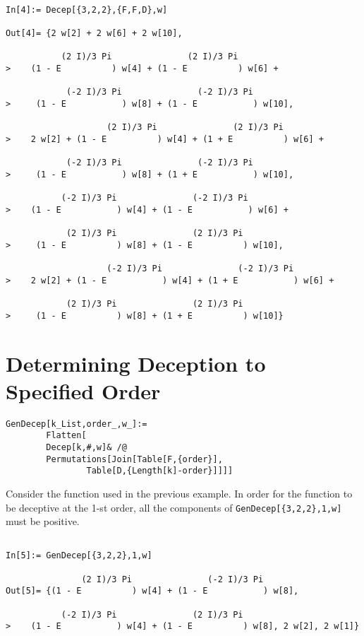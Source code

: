 \begin{verbatim}

In[4]:= Decep[{3,2,2},{F,F,D},w]

Out[4]= {2 w[2] + 2 w[6] + 2 w[10], 
 
           (2 I)/3 Pi               (2 I)/3 Pi
>    (1 - E          ) w[4] + (1 - E          ) w[6] + 
 
            (-2 I)/3 Pi               (-2 I)/3 Pi
>     (1 - E           ) w[8] + (1 - E           ) w[10], 
 
                    (2 I)/3 Pi               (2 I)/3 Pi
>    2 w[2] + (1 - E          ) w[4] + (1 + E          ) w[6] + 
 
            (-2 I)/3 Pi               (-2 I)/3 Pi
>     (1 - E           ) w[8] + (1 + E           ) w[10], 
 
           (-2 I)/3 Pi               (-2 I)/3 Pi
>    (1 - E           ) w[4] + (1 - E           ) w[6] + 
 
            (2 I)/3 Pi               (2 I)/3 Pi
>     (1 - E          ) w[8] + (1 - E          ) w[10], 
 
                    (-2 I)/3 Pi               (-2 I)/3 Pi
>    2 w[2] + (1 - E           ) w[4] + (1 + E           ) w[6] + 
 
            (2 I)/3 Pi               (2 I)/3 Pi
>     (1 - E          ) w[8] + (1 + E          ) w[10]}

\end{verbatim}
\section{Determining Deception to Specified Order}
\begin{verbatim}
GenDecep[k_List,order_,w_]:=
        Flatten[
        Decep[k,#,w]& /@
        Permutations[Join[Table[F,{order}],
                Table[D,{Length[k]-order}]]]]

\end{verbatim}
\begin{example}
Consider the function used in the previous example.  In order for the
function to be deceptive at the 1-st order, all the components of
{\tt GenDecep[\{3,2,2\},1,w]} must be positive.
\end{example}
\begin{verbatim}

In[5]:= GenDecep[{3,2,2},1,w]

               (2 I)/3 Pi               (-2 I)/3 Pi
Out[5]= {(1 - E          ) w[4] + (1 - E           ) w[8], 
 
           (-2 I)/3 Pi               (2 I)/3 Pi
>    (1 - E           ) w[4] + (1 - E          ) w[8], 2 w[2], 2 w[1]}

\end{verbatim}
